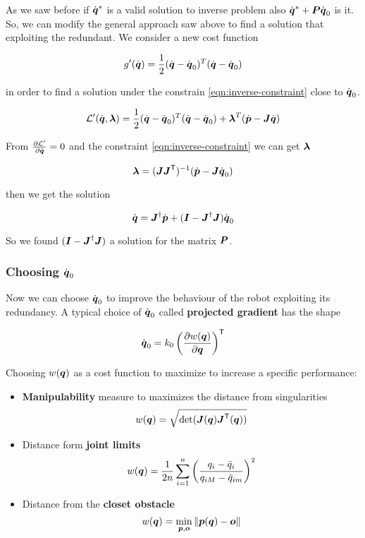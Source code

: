 As we saw before if $\dot{\boldsymbol{q}}^*$ is a valid solution to inverse problem also $\dot{\boldsymbol{q}}^* + \boldsymbol{P}\dot{\boldsymbol{q}}_0$ is it. So, we can modify the general approach saw above to find a solution that exploiting the redundant. We consider a new cost function

$$ g'(\dot{\boldsymbol{q}}) = \frac{1}{2} (\dot{\boldsymbol{q}} - \dot{\boldsymbol{q}}_0)^T (\dot{\boldsymbol{q}} - \dot{\boldsymbol{q}}_0) $$

in order to find a solution under the constrain \ref{eqn:inverse-constraint} close to $\dot{\boldsymbol{q}}_0$.

$$ \mathcal{L}'(\dot{\boldsymbol{q}}, \boldsymbol{\lambda}) = \frac{1}{2} (\dot{\boldsymbol{q}} - \dot{\boldsymbol{q}}_0)^T (\dot{\boldsymbol{q}} - \dot{\boldsymbol{q}}_0) + \boldsymbol{\lambda}^T (\dot{\boldsymbol{p}} - \boldsymbol{J} \dot{\boldsymbol{q}}) $$

From $\frac{\partial \mathcal{L}'}{\partial \dot{\boldsymbol{q}}} = 0$ and the constraint \ref{eqn:inverse-constraint} we can get $\boldsymbol{\lambda}$

$$\boldsymbol{\lambda} = (\boldsymbol{J}\boldsymbol{J}^{\mathsf{T}})^{-1} (\dot{\boldsymbol{p}} - \boldsymbol{J}\dot{\boldsymbol{q}}_0)$$

then we get the solution

$$ \dot{\boldsymbol{q}} = \boldsymbol{J}^\dag \dot{\boldsymbol{p}} + (\boldsymbol{I} - \boldsymbol{J}^\dag \boldsymbol{J}) \dot{\boldsymbol{q}}_0 $$

So we found $(\boldsymbol{I} - \boldsymbol{J}^\dag \boldsymbol{J})$ a solution for the matrix $\boldsymbol{P}$.

\subsubsection{Choosing $\dot{\boldsymbol{q}}_0$}

Now we can choose $\dot{\boldsymbol{q}}_0$ to improve the behaviour of the robot exploiting its redundancy. A typical choice of $\dot{\boldsymbol{q}}_0$ called \textbf{projected gradient} has the shape

$$ \dot{\boldsymbol{q}}_0 = k_0 \left(\frac{\partial w(\boldsymbol{q})}{\partial \boldsymbol{q}}\right)^{\mathsf{T}} $$

Choosing $w(\boldsymbol{q})$ as a cost function to maximize to increase a specific performance:

\begin{itemize}
\item \textbf{Manipulability} measure to maximizes the distance from singularities
$$ w(\boldsymbol{q}) = \sqrt{\det(\boldsymbol{J}(\boldsymbol{q})\boldsymbol{J}^{\mathsf{T}}(\boldsymbol{q}))}$$

\item Distance form \textbf{joint limits}
$$ w(\boldsymbol{q}) = \frac{1}{2n} \sum_{i=1}^{n} \left( \frac{q_i - \bar{q}_i}{q_{iM} - \bar{q}_{im}} \right)^2 $$

\item Distance from the \textbf{closet obstacle}
$$ w(\boldsymbol{q}) = \min_{\boldsymbol{p},\boldsymbol{o}}\left\lVert\boldsymbol{p}(\boldsymbol{q})-\boldsymbol{o}\right\rVert $$
\end{itemize}

